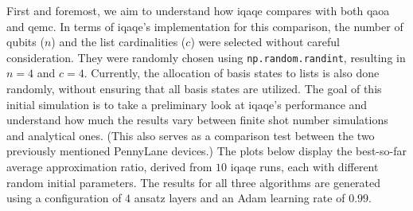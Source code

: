 First and foremost, we aim to understand how \acrshort{iqaqe} compares with both \acrshort{qaoa} and \acrshort{qemc}. In terms of \acrshort{iqaqe}'s implementation for this comparison, the number of qubits ($n$) and the list cardinalities ($c$) were selected without careful consideration. They were randomly chosen using \texttt{np.random.randint}, resulting in $n = 4$ and $c = 4$. Currently, the allocation of basis states to lists is also done randomly, without ensuring that all basis states are utilized. The goal of this initial simulation is to take a preliminary look at \acrshort{iqaqe}'s performance and understand how much the results vary between finite shot number simulations and analytical ones. (This also serves as a comparison test between the two previously mentioned PennyLane devices.) The plots below display the best-so-far average approximation ratio, derived from $10$ \acrshort{iqaqe} runs, each with different random initial parameters. The results for all three algorithms are generated using a configuration of $4$ ansatz layers and an Adam learning rate of $0.99$.

